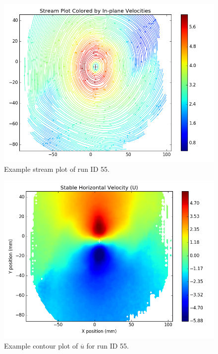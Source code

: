 {\begin{figure}[H]
	\centering
	\includegraphics[width=5in]{figs/example_vortex_figs/example_stream}
	\caption{Example stream plot of run ID 55.}
	\label{fig:examp_stream}
\end{figure}

\begin{figure}[H]
	\centering
	\includegraphics[width=5in]{figs/example_vortex_figs/example_U_contour}
\caption{Example contour plot of $\overline{u}$ for run ID 55.}
\label{fig:examp_U}
\end{figure}

}

